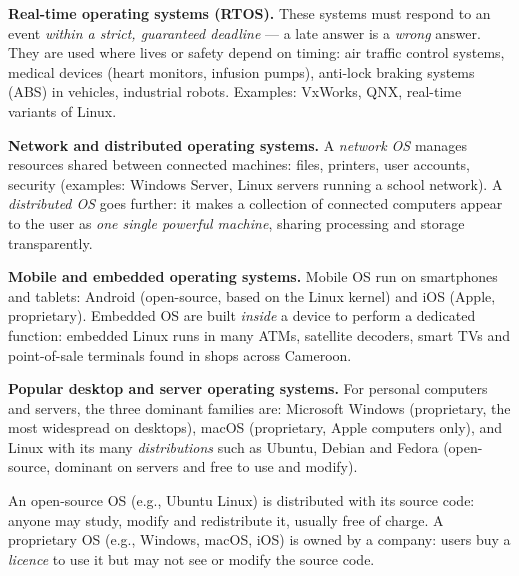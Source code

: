 \documentclass[11pt]{article}
\newcommand{\cle}[1]{{\popxbold\color{popdark}#1}}
\begin{document}
\textbf{Real-time operating systems (RTOS).} These systems must respond to an event \emph{within a strict, guaranteed deadline} --- a late answer is a \emph{wrong} answer. They are used where lives or safety depend on timing: air traffic control systems, medical devices (heart monitors, infusion pumps), anti-lock braking systems (ABS) in vehicles, industrial robots. Examples: VxWorks, QNX, real-time variants of Linux.

\textbf{Network and distributed operating systems.} A \emph{network OS} manages resources shared between connected machines: files, printers, user accounts, security (examples: Windows Server, Linux servers running a school network). A \emph{distributed OS} goes further: it makes a collection of connected computers appear to the user as \emph{one single powerful machine}, sharing processing and storage transparently.

\textbf{Mobile and embedded operating systems.} Mobile OS run on smartphones and tablets: \cle{Android} (open-source, based on the Linux kernel) and \cle{iOS} (Apple, proprietary). Embedded OS are built \emph{inside} a device to perform a dedicated function: embedded Linux runs in many ATMs, satellite decoders, smart TVs and point-of-sale terminals found in shops across Cameroon.

\textbf{Popular desktop and server operating systems.} For personal computers and servers, the three dominant families are: \cle{Microsoft Windows} (proprietary, the most widespread on desktops), \cle{macOS} (proprietary, Apple computers only), and \cle{Linux} with its many \emph{distributions} such as Ubuntu, Debian and Fedora (open-source, dominant on servers and free to use and modify).

\begin{propriete}
An \cle{open-source} OS (e.g., Ubuntu Linux) is distributed with its source code: anyone may study, modify and redistribute it, usually free of charge. A \cle{proprietary} OS (e.g., Windows, macOS, iOS) is owned by a company: users buy a \emph{licence} to use it but may not see or modify the source code.
\end{propriete}
\end{document}
